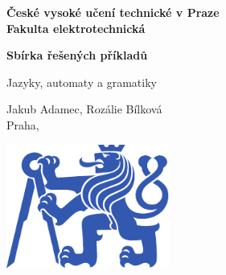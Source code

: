 \documentclass[11pt,a4paper]{article}
\begin{document}
 

\begin{titlepage}
    \centering
    \vspace*{2cm}

    {\Large \textbf{České vysoké učení technické v Praze}\\}
    \vspace{0.2cm}
    {\Large \textbf{Fakulta elektrotechnická}\\}
    
    \vspace{1cm}
    {\Huge \textbf{Sbírka řešených příkladů}\\}

    \vspace{0.5cm}
    {\Large Jazyky, automaty a gramatiky\\}

    \vspace{2cm}
    { Jakub Adamec, Rozálie Bílková\\}
    { Praha, \the\year\\}

    \vspace{2cm}

    \vspace{2cm}
    \includegraphics[width=0.4\textwidth]{media/symbol_cvut_plna_samostatna_verze_Pantone.pdf}

    \vfill
    
\end{titlepage}

\clearpage
{}
\setcounter{page}{1}

\tableofcontents
{}

\clearpage
{}
\setcounter{page}{1} 





 
\end{document}
